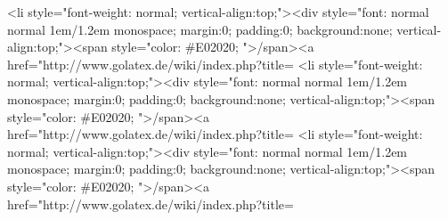 <li style="font-weight: normal; vertical-align:top;"><div style="font: normal normal 1em/1.2em monospace; margin:0; padding:0; background:none; vertical-align:top;"><span style="color: #E02020; ">\</span><a href="http://www.golatex.de/wiki/index.php?title=%
<li style="font-weight: normal; vertical-align:top;"><div style="font: normal normal 1em/1.2em monospace; margin:0; padding:0; background:none; vertical-align:top;"><span style="color: #E02020; ">\</span><a href="http://www.golatex.de/wiki/index.php?title=%
<li style="font-weight: normal; vertical-align:top;"><div style="font: normal normal 1em/1.2em monospace; margin:0; padding:0; background:none; vertical-align:top;"><span style="color: #E02020; ">\</span><a href="http://www.golatex.de/wiki/index.php?title=%
